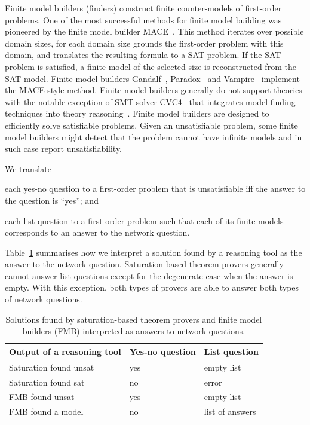Finite model builders (finders) construct finite counter-models of first-order problems. One of the most successful methods for finite model building was pioneered by the finite model builder MACE~\cite{mccune1994davis}. This method iterates over possible domain sizes, for each domain size grounds the first-order problem with this domain, and translates the resulting formula to a SAT problem. If the SAT problem is satisfied, a finite model of the selected size is reconstructed from the SAT model. Finite model builders Gandalf~\cite{Gandalf}, Paradox~\cite{claessen2003new} and Vampire~\cite{VampireFMB} implement the MACE-style method. Finite model builders generally do not support theories with the notable exception of SMT solver CVC4~\cite{CVC4} that integrates model finding techniques into theory reasoning~\cite{CVC4FMB}. Finite model builders are designed to efficiently solve satisfiable problems. Given an unsatisfiable problem, some finite model builders might detect that the problem cannot have infinite models and in such case report unsatisfiability.

We translate
\begin{enumerate*}[label=(\roman*)]
  \item each yes-no question to a first-order problem that is unsatisfiable iff the answer to the question is ``yes''; and
  \item each list question to a first-order problem such that each of its finite models corresponds to an answer to the network question.
\end{enumerate*}
Table~\ref{fig:fol-answering-questions} summarises how we interpret a solution found by a reasoning tool as the answer to the network question. Saturation-based theorem provers generally cannot answer list questions except for the degenerate case when the answer is empty. With this exception, both types of provers are able to answer both types of network questions. 

\begin{table}
  \center
  \begin{tabular}{lll}
    \hline
    Output of a reasoning tool & Yes-no question & List question \\
    \hline
    Saturation found unsat & yes & empty list \\
    Saturation found sat   & no  & error \\
    FMB found unsat        & yes & empty list \\
    FMB found a model      & no  & list of answers \\
  \end{tabular}
  \caption{Solutions found by saturation-based theorem provers and finite model builders (FMB) interpreted as answers to network questions.}
  \label{fig:fol-answering-questions}
\end{table}

